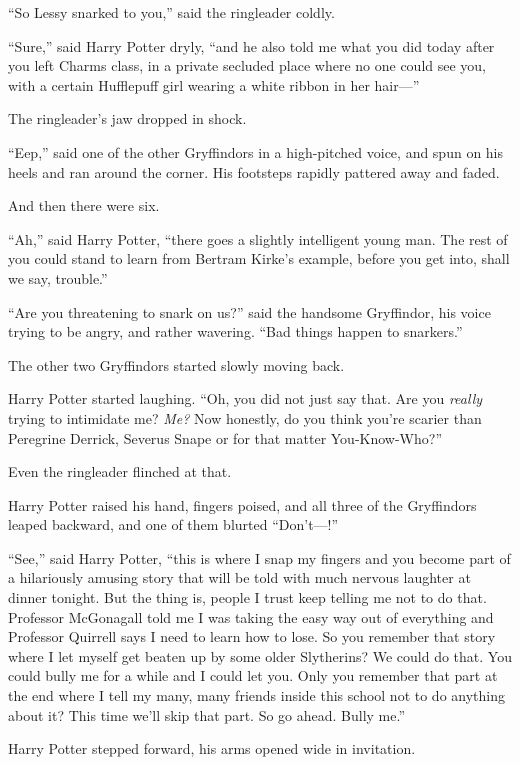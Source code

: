``So Lessy snarked to you,'' said the ringleader coldly.

``Sure,'' said Harry Potter dryly, ``and he also told me what you did
today after you left Charms class, in a private secluded place where no
one could see you, with a certain Hufflepuff girl wearing a white ribbon
in her hair---''

The ringleader's jaw dropped in shock.

``Eep,'' said one of the other Gryffindors in a high-pitched voice, and
spun on his heels and ran around the corner. His footsteps rapidly
pattered away and faded.

And then there were six.

``Ah,'' said Harry Potter, ``there goes a slightly intelligent young
man. The rest of you could stand to learn from Bertram Kirke's example,
before you get into, shall we say, trouble.''

``Are you threatening to snark on us?'' said the handsome Gryffindor,
his voice trying to be angry, and rather wavering. ``Bad things happen
to snarkers.''

The other two Gryffindors started slowly moving back.

Harry Potter started laughing. ``Oh, you did not just say that. Are you
\emph{really} trying to intimidate me? \emph{Me?} Now honestly, do you
think you're scarier than Peregrine Derrick, Severus Snape or for that
matter You-Know-Who?''

Even the ringleader flinched at that.

Harry Potter raised his hand, fingers poised, and all three of the
Gryffindors leaped backward, and one of them blurted ``Don't---!''

``See,'' said Harry Potter, ``this is where I snap my fingers and you
become part of a hilariously amusing story that will be told with much
nervous laughter at dinner tonight. But the thing is, people I trust
keep telling me not to do that. Professor McGonagall told me I was
taking the easy way out of everything and Professor Quirrell says I need
to learn how to lose. So you remember that story where I let myself get
beaten up by some older Slytherins? We could do that. You could bully me
for a while and I could let you. Only you remember that part at the end
where I tell my many, many friends inside this school not to do anything
about it? This time we'll skip that part. So go ahead. Bully me.''

Harry Potter stepped forward, his arms opened wide in invitation.

